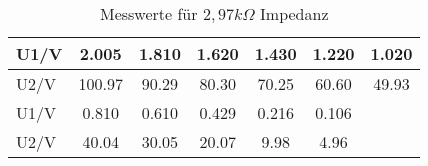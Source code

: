 \begin{table}[H]
	\centering
  \caption{ Messwerte für $2,97 k\Omega$ Impedanz}
\begin{tabular}{|l|c|c|c|c|c|c|}
\hline
U1/V & 2.005 &1.810 & 1.620 & 1.430 & 1.220 & 1.020 \\
 \hline 
U2/V & 100.97 & 90.29 & 80.30 & 70.25 & 60.60 & 49.93\\
  \hline
  \hline
U1/V & 0.810 & 0.610 & 0.429 & 0.216 & 0.106 & {} \\
 \hline 
 U2/V &  40.04 & 30.05 & 20.07 & 9.98 & 4.96 & {} \\
\hline

\end{tabular}

\end{table}

